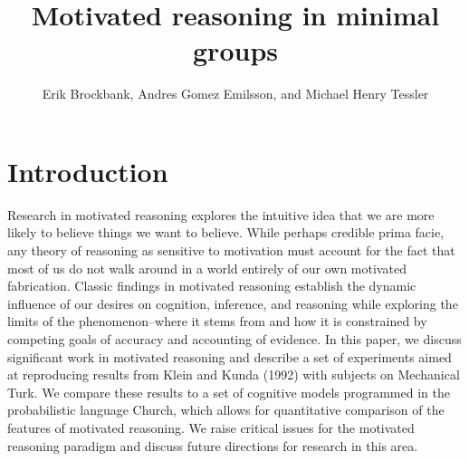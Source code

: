 \documentclass{article}
\begin{document}
 \title{Motivated reasoning in minimal groups}
\author{Erik Brockbank, Andres Gomez Emilsson, and Michael Henry Tessler} \renewcommand{\today}{Psych 241\\June 8,
2014} \maketitle

\section{Introduction}

Research in motivated reasoning explores the intuitive idea that we are more likely to believe things we want to believe. While perhaps credible prima facie, any theory of reasoning as sensitive to motivation must account for the fact that most of us do not walk around in a world entirely of our own motivated fabrication. Classic findings in motivated reasoning establish the dynamic influence of our desires on cognition, inference, and reasoning while exploring the limits of the phenomenon--where it stems from and how it is constrained by competing goals of accuracy and accounting of evidence. In this paper, we discuss significant work in motivated reasoning and describe a set of experiments aimed at reproducing results from Klein and Kunda (1992) with subjects on Mechanical Turk. We compare these results to a set of cognitive models programmed in the probabilistic language Church, which allows for quantitative comparison of the features of motivated reasoning. We raise critical issues for the motivated reasoning paradigm and discuss future directions for research in this area. 
\end{document}
